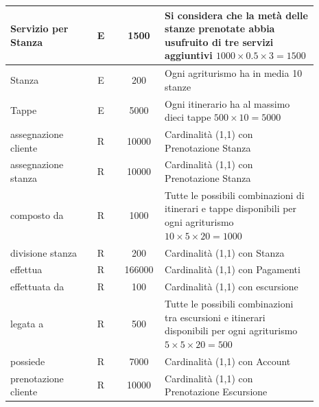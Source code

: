 \documentclass[12pt,a4paper]{article}
\begin{document}
\begin{center}
\begin{longtable}{|p{0.23\linewidth}|p{0.1\linewidth}|p{0.11\linewidth}|p{0.45\linewidth}|}
\hline
Servizio per Stanza
 & 
\multicolumn{1}{|c|}{E}
 & 
\multicolumn{1}{|c|}{1500}
 & 
Si considera che la metà delle stanze prenotate abbia usufruito di tre servizi aggiuntivi $1000\times 0.5 \times 3 = 1500$
\\

\hline
Stanza
 & 
\multicolumn{1}{|c|}{E}
 & 
\multicolumn{1}{|c|}{200}
 & 
Ogni agriturismo ha in media 10 stanze
\\

\hline
Tappe
 & 
\multicolumn{1}{|c|}{E}
 & 
\multicolumn{1}{|c|}{5000}
 & 
Ogni itinerario ha al massimo dieci tappe $500\times 10= 5000$
\\

\hline
assegnazione cliente
 & 
\multicolumn{1}{|c|}{R}
 & 
\multicolumn{1}{|c|}{10000}
 & 
Cardinalità (1,1) con Prenotazione Stanza
\\

\hline
assegnazione stanza
 & 
\multicolumn{1}{|c|}{R}
 & 
\multicolumn{1}{|c|}{10000}
 & 
Cardinalità (1,1) con Prenotazione Stan\-za 
\\

\hline
composto da
 & 
\multicolumn{1}{|c|}{R}
 & 
\multicolumn{1}{|c|}{1000}
 & 
Tutte le possibili combinazioni di itinerari e tappe disponibili per ogni agriturismo $10\times 5 \times 20 = 1000$
\\

\hline
divisione stanza
 & 
\multicolumn{1}{|c|}{R}
 & 
\multicolumn{1}{|c|}{200}
 & 
Cardinalità (1,1) con Stanza
\\

\hline
effettua
 & 
\multicolumn{1}{|c|}{R}
 & 
\multicolumn{1}{|c|}{166000}
 & 
Cardinalità (1,1) con Pagamenti
\\

\hline
effettuata da
 & 
\multicolumn{1}{|c|}{R}
 & 
\multicolumn{1}{|c|}{100}
 & 
Cardinalità (1,1) con escursione
\\

\hline
legata a
 & 
\multicolumn{1}{|c|}{R}
 & 
\multicolumn{1}{|c|}{500}
 & 
Tutte le possibili combinazioni tra escursioni e itinerari disponibili per ogni agriturismo $5\times 5 \times 20= 500$
\\

\hline
possiede
 & 
\multicolumn{1}{|c|}{R}
 & 
\multicolumn{1}{|c|}{7000}
 & 
Cardinalità (1,1) con Account
\\

\hline
prenotazione cliente
 & 
\multicolumn{1}{|c|}{R}
 & 
\multicolumn{1}{|c|}{10000}
 & 
Cardinalità (1,1) con Prenotazione Escursione
\\


\end{longtable}
\end{center}
\end{document}
